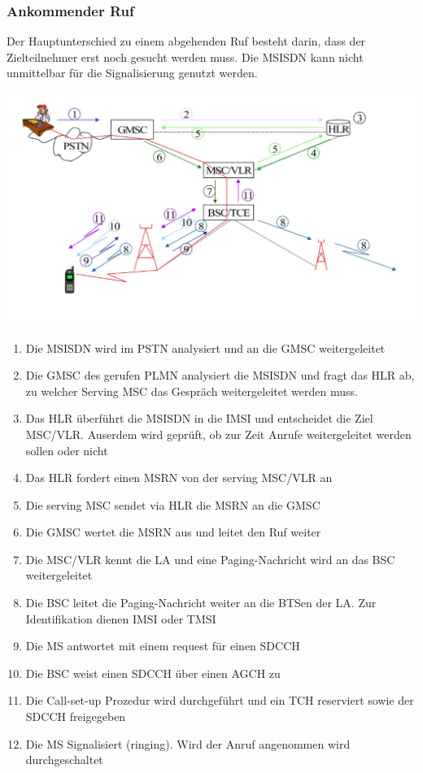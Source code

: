 \subsubsection{Ankommender Ruf}
\begin{minipage}{0.5 \linewidth}
Der Hauptunterschied zu einem abgehenden Ruf besteht darin, dass der Zielteilnehmer erst noch gesucht werden muss. Die MSISDN kann nicht unmittelbar für die Signalisierung genutzt werden. 

\includegraphics[width = \linewidth]{./Pics/GSMRuf2}
\end{minipage}
\begin{minipage}{0.5 \linewidth}
\begin{enumerate}
\item Die MSISDN wird im PSTN analysiert und an die GMSC weitergeleitet
\item Die GMSC des gerufen PLMN analysiert die MSISDN und fragt das HLR ab, zu welcher Serving MSC das Gespräch weitergeleitet werden muss. 
\item Das HLR überführt die MSISDN in die IMSI und entscheidet die Ziel MSC/VLR. Auserdem wird geprüft, ob zur Zeit Anrufe weitergeleitet werden sollen oder nicht
\item Das HLR fordert einen MSRN von der serving MSC/VLR an
\item Die serving MSC sendet via HLR die MSRN an die GMSC
\item Die GMSC wertet die MSRN aus und leitet den Ruf weiter
\item Die MSC/VLR kennt die LA und eine Paging-Nachricht wird an das BSC weitergeleitet
\item Die BSC leitet die Paging-Nachricht weiter an die BTSen der LA. Zur Identifikation dienen IMSI oder TMSI
\item Die MS antwortet mit einem request für einen SDCCH
\item Die BSC weist einen SDCCH über einen AGCH zu 
\item Die Call-set-up Prozedur wird durchgeführt und ein TCH reserviert sowie der SDCCH freigegeben
\item Die MS Signalisiert (ringing). Wird der Anruf angenommen wird durchgeschaltet
\end{enumerate}
\end{minipage}

